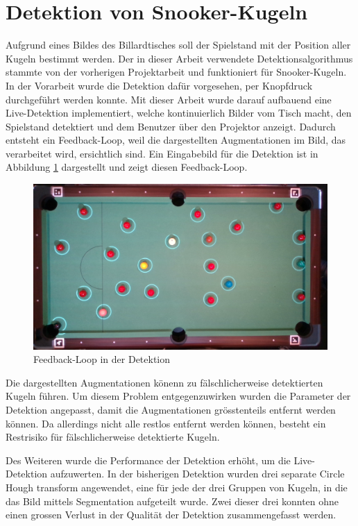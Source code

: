 \newpage
\section{Detektion von Snooker-Kugeln}\label{kap:detektion}
Aufgrund eines Bildes des Billardtisches soll der Spielstand mit der Position aller Kugeln bestimmt werden.
Der in dieser Arbeit verwendete Detektionsalgorithmus stammte von der vorherigen Projektarbeit\cite{project2:snooker_detection}
und funktioniert für Snooker-Kugeln.
In der Vorarbeit wurde die Detektion dafür vorgesehen, per Knopfdruck durchgeführt werden konnte.
Mit dieser Arbeit wurde darauf aufbauend eine Live-Detektion implementiert, welche kontinuierlich Bilder vom Tisch macht,
den Spielstand detektiert und dem Benutzer über den Projektor anzeigt.
Dadurch entsteht ein Feedback-Loop, weil die dargestellten Augmentationen im Bild, das verarbeitet wird, ersichtlich sind.
Ein Eingabebild für die Detektion ist in Abbildung \ref{fig:detection_feedback_loop} dargestellt und zeigt diesen Feedback-Loop.

\begin{figure}[h!]
    \begin{center}
        \includegraphics[width=0.8\linewidth]{../common/03_billiard_ai/resources/detection_feedback_loop.png}
    \end{center}
    \caption{Feedback-Loop in der Detektion}
    \label{fig:detection_feedback_loop}
\end{figure}

Die dargestellten Augmentationen könenn zu fälschlicherweise detektierten Kugeln führen.
Um diesem Problem entgegenzuwirken wurden die Parameter der Detektion angepasst, damit die Augmentationen grösstenteils
entfernt werden können. Da allerdings nicht alle restlos entfernt werden können, besteht ein Restrisiko für
fälschlicherweise detektierte Kugeln.

Des Weiteren wurde die Performance der Detektion erhöht, um die Live-Detektion aufzuwerten.
In der bisherigen Detektion wurden drei separate Circle Hough transform\cite{wiki:circle_hough} angewendet, eine für
jede der drei Gruppen von Kugeln, in die das Bild mittels Segmentation aufgeteilt wurde\cite{project2:snooker_detection}.
Zwei dieser drei konnten ohne einen grossen Verlust in der Qualität der Detektion zusammengefasst werden.

